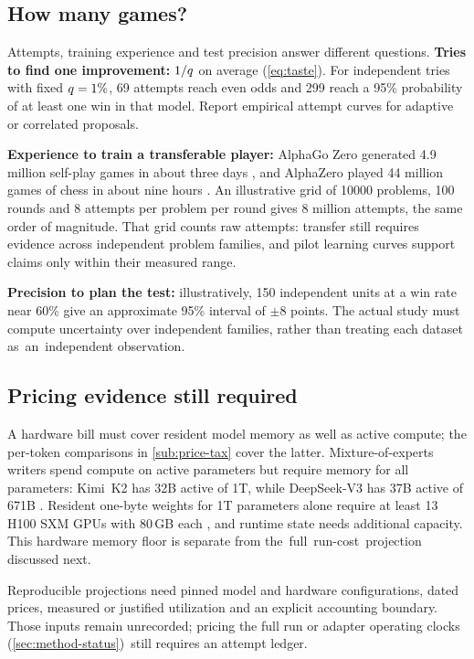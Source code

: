 \subsection{How many games?}\label{sub:price-games}

Attempts, training experience and test precision answer different questions.
\textbf{Tries to find one improvement:} $1/q$ on average (\cref{eq:taste}).
For independent tries with fixed $q = 1\%$, 69 attempts reach even
odds and 299 reach a 95\% probability of at least one win in that model.
Report empirical attempt curves for adaptive or correlated proposals.

\textbf{Experience to train a transferable player:} AlphaGo Zero generated
4.9 million self-play games in about three days \citep{silver2017mastering},
and AlphaZero played 44 million games of chess in about nine hours
\citep{silver2018general}. An illustrative grid of \num{10000}
problems, 100 rounds and 8 attempts per problem per round gives 8 million
attempts, the same order of magnitude.
That grid counts raw attempts: transfer still requires evidence across
independent problem families, and pilot learning curves support claims only
within their measured range.

\textbf{Precision to plan the test:} illustratively, 150 independent
units at a win rate near 60\% give an approximate 95\% interval of
$\pm 8$ points. The actual study must compute uncertainty over independent
families, rather than treating each dataset \mbox{as an independent} observation.

\subsection{Pricing evidence still required}\label{sub:price-run}

A hardware bill must cover resident model memory as well as active
compute; the per-token comparisons in \cref{sub:price-tax} cover the latter.
Mixture-of-experts writers spend compute on active parameters but require memory
for all parameters: Kimi~K2 has 32B active of 1T, while DeepSeek-V3 has 37B
active of 671B \citep{kimiteam2025k2,deepseekv3}. Resident one-byte weights
for 1T parameters alone require at least 13 H100 SXM GPUs with 80\,GB each
\citep{nvidia2026h100}, and runtime state needs additional capacity. This hardware memory
floor is separate from \mbox{the full run-cost projection} discussed next.

Reproducible projections need pinned model and hardware configurations,
dated prices, measured or justified utilization and an explicit accounting
boundary. Those inputs remain unrecorded; pricing the full run or adapter operating
clocks \mbox{(\cref{sec:method-status}) still} requires an attempt ledger.

